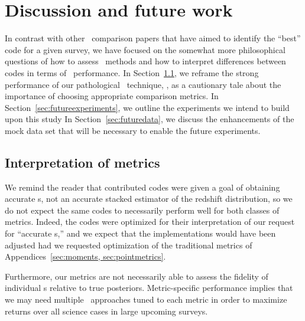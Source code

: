 \section{Discussion and future work}
\label{sec:discussion}


In contrast with other \pzpdf\ comparison papers that have aimed to identify the ``best'' code for a given survey, we have focused on the somewhat more philosophical questions of how to assess \pzpdf\ methods and how to interpret differences between codes in terms of \pzpdf\ performance.
In Section~\ref{sec:caution}, we reframe the strong performance of our pathological \pzpdf\ technique, \trainz, as a cautionary tale about the importance of choosing appropriate comparison metrics.
In Section~\ref{sec:futureexperiments}, we outline the experiments we intend to build upon this study
In Section~\ref{sec:futuredata}, we discuss the enhancements of the mock data set that will be necessary to enable the future experiments.

\subsection{Interpretation of metrics}
\label{sec:caution}

We remind the reader that contributed codes were given a goal of obtaining accurate \pzpdf s, not an accurate stacked estimator of the redshift distribution, so we do not expect the same codes to necessarily perform well for both classes of metrics.
Indeed, the codes were optimized for their interpretation of our request for ``accurate \pzpdf s,'' and we expect that the implementations would have been adjusted had we requested optimization of the traditional metrics of Appendices~\ref{sec:moments, sec:pointmetrics}.

Furthermore, our metrics are not necessarily able to assess the fidelity of individual \pzpdf s relative to true posteriors.
Metric-specific performance implies that we may need multiple \pzpdf\ approaches tuned to each metric in order to maximize returns over all science cases in large upcoming surveys.

